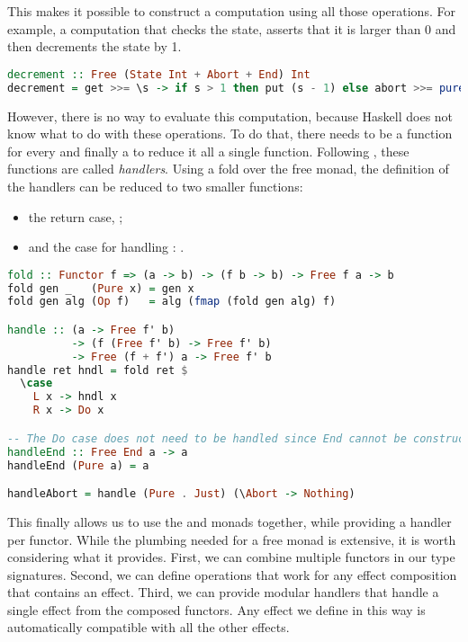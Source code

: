 This makes it possible to construct a computation using all those operations. For example, a computation that checks the state, asserts that it is larger than 0 and then decrements the state by 1.

\begin{lstlisting}[language=haskell,style=fancy]
decrement :: Free (State Int + Abort + End) Int
decrement = get >>= \s -> if s > 1 then put (s - 1) else abort >>= pure (s - 1)
\end{lstlisting}

However, there is no way to evaluate this computation, because Haskell does not know what to do with these operations. To do that, there needs to be a function  for every  and finally a  to reduce it all a single function. Following \textcite{castagna_handlers_2009}, these functions are called \emph{handlers}. Using a fold over the free monad, the definition of the handlers can be reduced to two smaller functions:
\begin{itemize}
    \item the return case, ;
    \item and the case for handling : .
\end{itemize}

\begin{lstlisting}[language=haskell,style=fancy]
fold :: Functor f => (a -> b) -> (f b -> b) -> Free f a -> b
fold gen _   (Pure x) = gen x
fold gen alg (Op f)   = alg (fmap (fold gen alg) f)

handle :: (a -> Free f' b)
          -> (f (Free f' b) -> Free f' b)
          -> Free (f + f') a -> Free f' b
handle ret hndl = fold ret $
  \case
    L x -> hndl x
    R x -> Do x

-- The Do case does not need to be handled since End cannot be constructed
handleEnd :: Free End a -> a
handleEnd (Pure a) = a

handleAbort = handle (Pure . Just) (\Abort -> Nothing)
\end{lstlisting}

This finally allows us to use the  and  monads together, while providing a handler per functor. While the plumbing needed for a free monad is extensive, it is worth considering what it provides. First, we can combine multiple functors in our type signatures. Second, we can define operations that work for any effect composition that contains an effect. Third, we can provide modular handlers that handle a single effect from the composed functors. Any effect we define in this way is automatically compatible with all the other effects.


